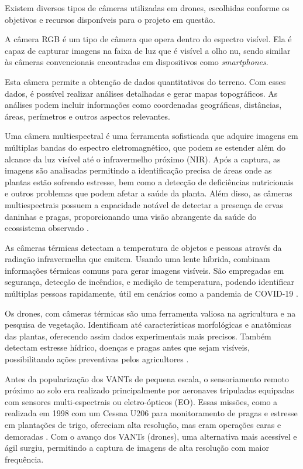 \documentclass[
    12pt,                   %
    openright,              %
    oneside,                %
    a4paper,                %
    sumario=tradicional,    %
    english,                %
    brazil,                 %
    ]{abntex2}
\begin{document}
    Existem diversos tipos de câmeras utilizadas em drones, escolhidas conforme os objetivos e recursos disponíveis para o projeto em questão.

    A câmera RGB é um tipo de câmera que opera dentro do espectro visível. Ela é capaz de capturar imagens na faixa de luz que é visível a olho nu, sendo similar às câmeras convencionais encontradas em dispositivos como \textit{smartphones}.

    Esta câmera permite a obtenção de dados quantitativos do terreno. Com esses dados, é possível realizar análises detalhadas e gerar mapas topográficos. As análises podem incluir informações como coordenadas geográficas, distâncias, áreas, perímetros e outros aspectos relevantes.

    Uma câmera multiespectral é uma ferramenta sofisticada que adquire imagens em múltiplas bandas do espectro eletromagnético, que podem se estender além do alcance da luz visível até o infravermelho próximo (NIR). Após a captura, as imagens são analisadas permitindo a identificação precisa de áreas onde as plantas estão sofrendo estresse, bem como a detecção de deficiências nutricionais e outros problemas que podem afetar a saúde da planta. Além disso, as câmeras multiespectrais possuem a capacidade notável de detectar a presença de ervas daninhas e pragas, proporcionando uma visão abrangente da saúde do ecossistema observado \cite{droneng2024}.


    As câmeras térmicas detectam a temperatura de objetos e pessoas através da radiação infravermelha que emitem. Usando uma lente híbrida, combinam informações térmicas comuns para gerar imagens visíveis. São empregadas em segurança, detecção de incêndios, e medição de temperatura, podendo identificar múltiplas pessoas rapidamente, útil em cenários como a pandemia de COVID-19 \cite{aeon2024}.

    Os drones, com câmeras térmicas são uma ferramenta valiosa na agricultura e na pesquisa de vegetação. Identificam até características morfológicas e anatômicas das plantas, oferecendo assim dados experimentais mais precisos. Também detectam estresse hídrico, doenças e pragas antes que sejam visíveis, possibilitando ações preventivas pelos agricultores \cite{cnptia2024}.

     Antes da popularização dos VANTs de pequena escala, o sensoriamento remoto próximo ao solo era realizado principalmente por aeronaves tripuladas equipadas com sensores multi-espectrais ou eletro-ópticos (EO). Essas missões, como a realizada em 1998 com um Cessna U206 para monitoramento de pragas e estresse em plantações de trigo, ofereciam alta resolução, mas eram operações caras e demoradas \cite{Phang2023}. Com o avanço dos VANTs (drones), uma alternativa mais acessível e ágil surgiu, permitindo a captura de imagens de alta resolução com maior frequência.
    
\end{document}
